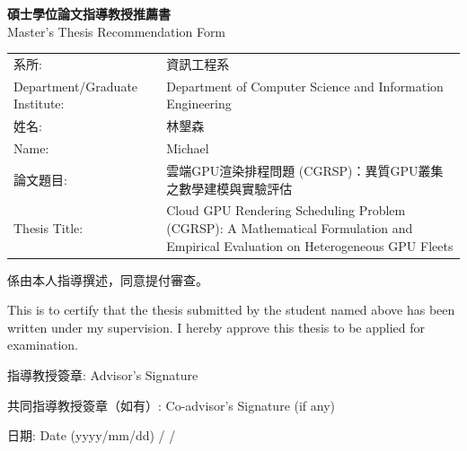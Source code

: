 \newpage
\thispagestyle{empty}

\begin{center}
{\large \textbf{碩士學位論文指導教授推薦書}}\\[0.3em]
{\normalsize Master's Thesis Recommendation Form}
\end{center}

\vspace{1cm}

\noindent
\begin{tabular}{l>{\RaggedRight}p{8.7cm}}
系所: & 資訊工程系 \\
Department/Graduate Institute: & Department of Computer Science and Information Engineering \\[0.5em]
姓名: & 林墾森 \\
Name: & Michael \\[0.5em]
論文題目: & 雲端GPU渲染排程問題 (CGRSP)：異質GPU叢集之數學建模與實驗評估 \\
Thesis Title: & Cloud GPU Rendering Scheduling Problem (CGRSP): A Mathematical Formulation and Empirical Evaluation on Heterogeneous GPU Fleets \\
\end{tabular}

\vspace{1cm}

\noindent 係由本人指導撰述，同意提付審查。

\noindent This is to certify that the thesis submitted by the student named above has been written under my supervision. I hereby approve this thesis to be applied for examination.

\vfill

\noindent 指導教授簽章: \hfill Advisor's Signature \hfill \underline{\hspace{6cm}}

\vspace{1cm}

\noindent 共同指導教授簽章（如有）: \hfill Co-advisor's Signature (if any) \hfill \underline{\hspace{4cm}}

\vspace{1cm}

\noindent 日期: \hfill Date (yyyy/mm/dd) \hfill \underline{\hspace{2.5cm}} / \underline{\hspace{1.5cm}} / \underline{\hspace{1.5cm}}

\vspace{1cm}
